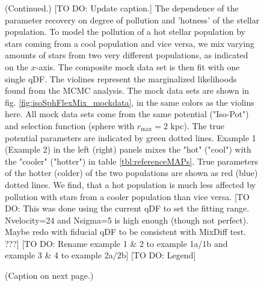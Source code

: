 \addtocounter{figure}{-1}
\begin{figure} [t!]
  \caption{(Continued.) [TO DO: Update caption.] The dependence of the parameter recovery on degree of pollution and 'hotness' of the stellar population. To model the pollution of a hot stellar population by stars coming from a cool population and vice versa, we mix varying amounts of stars from two very different populations, as indicated on the $x$-axis. The composite mock data set is then fit with one single qDF. The violines represent the marginalized likelihoods found from the MCMC analysis. The mock data sets are shown in fig. \ref{fig:isoSphFlexMix_mockdata}, in the same colors as the violins here. All mock data sets come from the same potential ("Iso-Pot") and selection function (sphere with $r_\text{max} = 2$ kpc). The true potential parameters are indicated by green dotted lines. Example 1 (Example 2) in the left (right) panels mixes the "hot" ("cool") \MAP with the "cooler" ("hotter") \MAP in table \ref{tbl:referenceMAPs}. True parameters of the hotter (colder) of the two populations are shown as red (blue) dotted lines. We find, that a hot population is much less affected by pollution with stars from a cooler population than vice versa.  [TO DO: This was done using the current qDF to set the fitting range. Nvelocity=24 and Nsigma=5 is high enough (though not perfect). Maybe redo with fiducial qDF to be consistent with MixDiff test. ???] [TO DO: Rename example 1 \& 2 to example 1a/1b and example 3 \& 4 to example 2a/2b] [TO DO: Legend]}
\end{figure}


\begin{figure}
\caption{(Caption on next page.)}
\label{fig:isoSphFlexMixDiff}
\end{figure}


